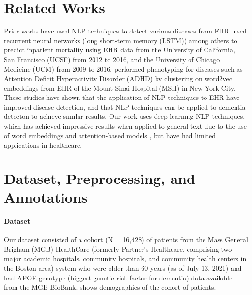 \documentclass[pmlr,twocolumn,10pt]{jmlr} %
\begin{document}
\section{Related Works}
\label{sec:RelatedWorks} 
Prior works have used NLP techniques to detect various diseases from EHR. \citep{rajkomar2018scalable} %
used recurrent neural networks (long short-term memory (LSTM)) among others to predict inpatient mortality using EHR data from the University of California, San Francisco (UCSF) from 2012 to 2016, and the University of Chicago Medicine (UCM) from 2009 to 2016.  \citep{glicksberg2018automated} %
performed phenotyping for diseases such as Attention Deficit Hyperactivity Disorder (ADHD) by clustering on word2vec embeddings from EHR of the Mount Sinai Hospital (MSH) in New York City. These studies have shown that the application of NLP techniques to EHR have improved disease detection, and that NLP techniques can be applied to dementia detecton to achieve similar results. Our work uses deep learning NLP techniques, which has achieved impressive results when applied to general text due to the use of word embeddings and attention-based models \citep{vaswani2017attention,mikolov2013distributed,pennington2014glove,peters2018deep, devlin2018bert}, but have had limited applications in healthcare. %

\section{Dataset, Preprocessing, and Annotations}
\label{sec:Dataset+Preprocessing+Annotations}

\paragraph{Dataset}
\label{sec:Dataset} Our dataset consisted of a cohort (N = 16,428) of patients from the Mass General Brigham (MGB) HealthCare (formerly Partner's Healthcare, comprising two major academic hospitals, community hospitals, and community health centers in the Boston area) system who were older than 60 years (as of July 13, 2021) and had APOE genotype (biggest genetic risk factor for dementia) data available from the MGB BioBank.  shows demographics of the cohort of patients.   
\end{document}
